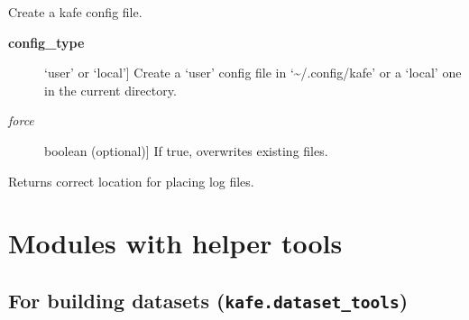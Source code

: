 \documentclass[a4paper,10pt,english]{sphinxmanual}
\begin{document}
\begin{fulllineitems}
\label{module_doc:kafe.config.create_config_file}
Create a kafe config file.
\begin{description}
\item[{\textbf{config\_type}}] \leavevmode{[}`user' or `local'{]}
Create a `user' config file in `\textasciitilde{}/.config/kafe' or a
`local' one in the current directory.

\item[{\emph{force}}] \leavevmode{[}boolean (optional){]}
If true, overwrites existing files.

\end{description}

\end{fulllineitems}


\begin{fulllineitems}
\label{module_doc:kafe.config.log_file}
Returns correct location for placing log files.

\end{fulllineitems}



\section{Modules with helper tools}
\label{module_doc:modules-with-helper-tools}

\subsection{For building datasets (\texttt{kafe.dataset\_tools})}
\label{module_doc:module-kafe.dataset_tools}\label{module_doc:for-building-datasets-kafe-dataset-tools}\label{module_doc:module-dataset_tools}
\end{document}
